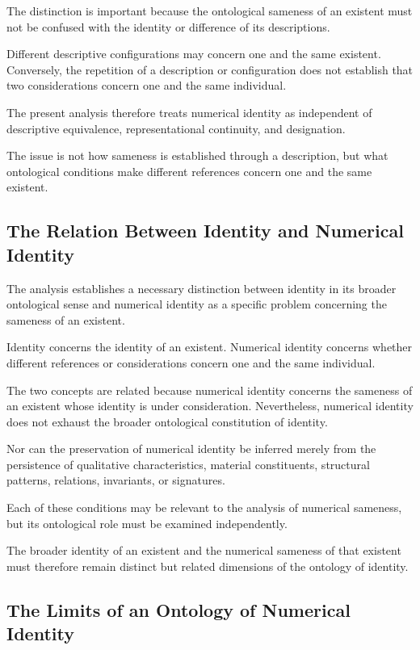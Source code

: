 The distinction is important because
the ontological sameness of an existent
must not be confused with the identity
or difference of its descriptions.

Different descriptive configurations
may concern one and the same existent.
Conversely, the repetition of a description
or configuration does not establish
that two considerations concern one
and the same individual.

The present analysis therefore treats
numerical identity as independent of
descriptive equivalence, representational
continuity, and designation.

The issue is not how sameness is
established through a description,
but what ontological conditions make
different references concern one
and the same existent.

\subsection{The Relation Between Identity and Numerical Identity}

The analysis establishes a necessary
distinction between identity in its
broader ontological sense and numerical
identity as a specific problem concerning
the sameness of an existent.

Identity concerns the identity of
an existent. Numerical identity concerns
whether different references or
considerations concern one and the
same individual.

The two concepts are related because
numerical identity concerns the sameness
of an existent whose identity is under
consideration. Nevertheless, numerical
identity does not exhaust the broader
ontological constitution of identity.

Nor can the preservation of numerical
identity be inferred merely from the
persistence of qualitative characteristics,
material constituents, structural patterns,
relations, invariants, or signatures.

Each of these conditions may be relevant
to the analysis of numerical sameness,
but its ontological role must be examined
independently.

The broader identity of an existent
and the numerical sameness of that
existent must therefore remain distinct
but related dimensions of the ontology
of identity.

\subsection{The Limits of an Ontology of Numerical Identity}

